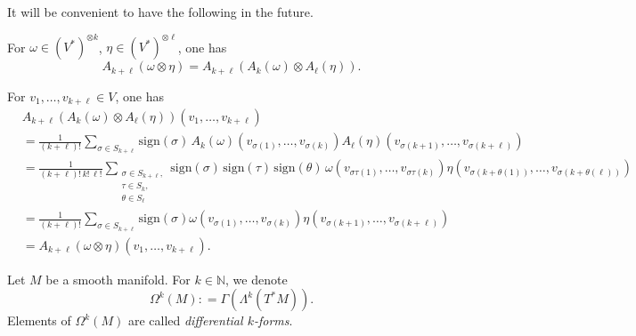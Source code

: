 \documentclass{ximera}
\begin{document}
It will be convenient to have the following in the future. 


\begin{lemma}
    For $\omega \in  ( V ^{\ast} )^{\otimes k } $, $\eta \in ( V ^{\ast } ) ^{\otimes \ell }$, one has
    \[   A_{k + \ell } ( \omega  \otimes \eta ) = A_{k + \ell } ( A_k (\omega) \otimes A_{\ell} (\eta) ).          \]
\end{lemma}


\begin{solution}
    For $v_1 , \ldots , v_{k + \ell } \in V$, one has
    \begin{align*}
         &A_{k + \ell }  ( A_k (\omega) \otimes A_{\ell} (\eta) ) (v_1, \ldots , v_{k + \ell }) \\
         & =  \frac{1}{(k+ \ell )! }  \sum_{\sigma \in S_{k + \ell} } \text{sign}(\sigma) \, A_k  (\omega )(  v_{ \sigma (1) } , \ldots , v_{\sigma  (k)}) A_{\ell } (\eta) ( v_{\sigma  (k + 1 )}, \ldots , v_{\sigma( k +  \ell )} ) \\
         & =  \frac{1}{(k+ \ell )! \, k ! \, \ell !}  \sum_{\substack{\sigma \in S_{k + \ell} ,  \\ \tau \in S_k , \\ \theta \in S_{\ell}}} \text{sign}(\sigma) \, \text{sign}(\tau) \, \text{sign}(\theta) \, \omega (  v_{ \sigma \tau(1) } , \ldots , v_{\sigma \tau (k)}) \eta ( v_{\sigma  (k + \theta (1) )}, \ldots , v_{\sigma( k + \theta (\ell ))} ) \\
         & = \frac{1}{(k + \ell )! } \sum_{\sigma \in S_{k + \ell} } \text{sign}(\sigma) \omega (v_{\sigma (1)}, \ldots , v_{\sigma (k)}) \eta (v_{\sigma (k + 1)}, \ldots , v_{\sigma (k + \ell )})\\
         & = A_{k + \ell } (\omega \otimes \eta ) ( v_1, \ldots , v_{k + \ell }) .  
    \end{align*}
\end{solution}



    \begin{definition}
        Let $M$ be a smooth manifold. For $k \in \mathbb{N}$, we denote
        \[    \Omega ^k (M) : = \Gamma (  \Lambda ^k (  T^{\ast} M   )  )  .       \]
        Elements of $\Omega ^k (M)$ are called \emph{differential $k$-forms}. 
    \end{definition}
\end{document}
